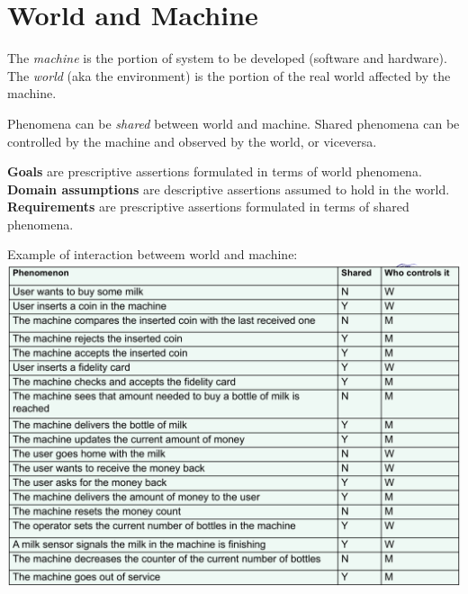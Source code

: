 \section{World and Machine}
The \emph{machine} is the portion of system to be developed (software and hardware).
The \emph{world} (aka the environment) is the portion of the real world affected by the machine.

Phenomena can be \emph{shared} between world and machine.
Shared phenomena can be controlled by the machine and observed by the world, or viceversa.

\textbf{Goals} are prescriptive assertions formulated in terms of world phenomena.\\
\textbf{Domain assumptions} are descriptive assertions assumed to hold in the world.\\
\textbf{Requirements} are prescriptive assertions formulated in terms of shared phenomena.

Example of interaction betweem world and machine:
\includegraphics[angle=90,origin=c,width=\linewidth]{3-world-machine/shared-example.png}
